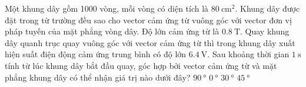 \begin{ex}
	Một khung dây gồm 1000 vòng, mỗi vòng có diện tích là $\SI{80}{\centi\meter^2}$. Khung dây được đặt trong từ trường đều sao cho vector cảm ứng từ vuông góc với vector đơn vị pháp tuyến của mặt phẳng vòng dây. Độ lớn cảm ứng từ là $\SI{0.8}{\tesla}$. Quay khung dây quanh trục quay vuông góc với vector cảm ứng từ thì trong khung dây xuất hiện suất điện động cảm ứng trung bình có độ lớn $\SI{6.4}{\volt}$. Sau khoảng thời gian $\SI{1}{\second}$ tính từ lúc khung dây bắt đầu quay, góc hợp bởi vector cảm ứng từ và mặt phẳng khung dây có thể nhận giá trị nào dưới đây?
	\choice
	{\True $\SI{90}{\degree}$}
	{$\SI{0}{\degree}$}
	{$\SI{30}{\degree}$}
	{$\SI{45}{\degree}$}
\end{ex}
